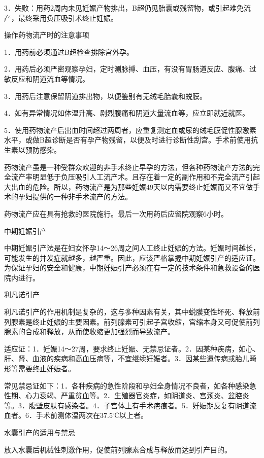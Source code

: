 \documentclass[12pt,UTF8,openany]{ctexbook}
\begin{document}
3．失败：用药2周内未见妊娠产物排出，B超仍见胎囊或残留物，或引起难免流产，最终采用负压吸引术终止妊娠。





操作药物流产时的注意事项


1．用药前必须通过B超检查排除宫外孕。

2．用药后必须严密观察孕妇，定时测脉搏、血压，有没有胃肠道反应、腹痛、过敏反应和阴道流血等情况。

3．用药后注意保留阴道排出物，以便鉴别有无绒毛胎囊和蜕膜。

4．如有异常情况如体温升高、剧烈腹痛和阴道大量流血等，应立即就近就医。

5．使用药物流产后出血时间超过两周者，应重复测定血或尿的绒毛膜促性腺激素水平，或做B超诊断是否有孕产物残留，以便及时进行诊断性刮宫。手术前使用抗生素以预防感染。

药物流产虽是一种受群众欢迎的非手术终止早孕的方法，但各种药物流产方法的完全流产率明显低于负压吸引人工流产术。且存在着一定的副作用和不完全流产引起大出血的危险。所以，药物流产是为那些妊娠49天以内需要终止妊娠而又不宜做手术的孕妇提供的一种非手术流产的方法。

药物流产应在具有抢救的医院施行。最后一次用药后应留院观察6小时。





中期妊娠引产


中期妊娠引产法是在妇女怀孕14～26周之间人工终止妊娠的方法。妊娠时间越长，可能发生的并发症就越多，越严重。因此，应该严格掌握中期妊娠引产的适应证。为保证孕妇的安全和健康，中期妊娠引产必须在有一定的技术条件和急救设备的医院内进行。

利凡诺引产

利凡诺引产的作用机制是复杂的，这与多种因素有关，其中蜕膜变性坏死、释放前列腺素是终止妊娠的主要因素。前列腺素可引起子宫收缩，宫缩本身又可促使前列腺素的合成和释放，从而使收缩更加强烈而导致流产。

适应证：1．妊娠14～27周，要求终止妊娠、无禁忌证者。2．因某种疾病，如心、肝、肾、血液的疾病和高血压病等，不宜继续妊娠者。3．因某些遗传病或胎儿畸形等需要终止妊娠者。

常见禁忌证如下：1．各种疾病的急性阶段和孕妇全身情况不良者，如各种感染急性期、心力衰竭、严重贫血等。2．生殖器官炎症，如阴道炎、宫颈炎、盆腔炎等。3．腹壁皮肤有感染者。4．子宫体上有手术疤痕者。5．妊娠期反复有阴道流血者。6．手术前测体温两次在37.5℃以上者。

水囊引产的适用与禁忌

放入水囊后机械性刺激作用，促使前列腺素合成与释放而达到引产目的。
\end{document}
